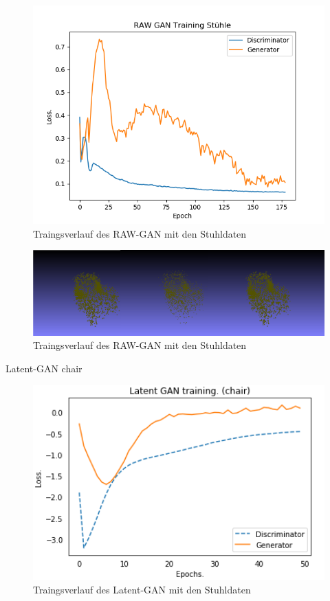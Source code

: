 \documentclass{llncs}
\begin{document}
\begin{figure}[htbp] 
	\centering
	\includegraphics[width=1.2\textwidth]{raw_gan_chair_result.png}
	\caption{Traingsverlauf des RAW-GAN mit den Stuhldaten}
	\label{fig:Bild37}
\end{figure}
\begin{figure}[htbp] 
	\centering
	\includegraphics[width=1.2\textwidth]{raw_gan_chair_example.png}
	\caption{Traingsverlauf des RAW-GAN mit den Stuhldaten}
	\label{fig:Bild38}
\end{figure}
Latent-GAN chair
\begin{figure}[htbp] 
	\centering
	\includegraphics[width=1.2\textwidth]{latent_gan_chair_result.png}
	\caption{Traingsverlauf des Latent-GAN mit den Stuhldaten}
	\label{fig:Bild37}
\end{figure}
\end{document}
